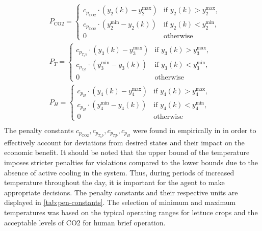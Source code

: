 \begin{equation}
\begin{aligned}
& P_{\text{CO2}} = 
\begin{cases} 
c_{p_{\text{CO2}}} \cdot (y_2(k) - y_2^{\text{max}}) & \text{if } y_2(k) > y_2^{\text{max}} , \\
c_{p_{\text{CO2}}} \cdot (y_2^{\text{min}} - y_2(k)) & \text{if } y_2(k) < y_2^{\text{min}} , \\
0 & \text{otherwise}
\end{cases}
\\
& P_{T} = 
\begin{cases} 
c_{p_{T_ub}} \cdot (y_3(k) - y_3^{\text{max}}) & \text{if } y_3(k) > y_3^{\text{max}} , \\
c_{p_{T_lb}} \cdot (y_3^{\text{min}} - y_3(k)) & \text{if } y_3(k) < y_3^{\text{min}} , \\
0 & \text{otherwise}
\end{cases}
\\
& P_{H} = 
\begin{cases} 
c_{p_{H}} \cdot (y_4(k) - y_4^{\text{max}}) & \text{if } y_4(k) > y_4^{\text{max}} , \\
c_{p_{H}} \cdot (y_4^{\text{min}} - y_4(k)) & \text{if } y_4(k) < y_4^{\text{min}} , \\
0 & \text{otherwise}
\end{cases}
\\
\end{aligned}
\end{equation}
The penalty constants $c_{p_{\text{CO2}}},c_{p_{T_ub}},c_{p_{T_lb}},c_{p_{H}}$ were found in empirically in \cite{jansenOptimalControlLettuce2023} in order to effectively account for deviations from desired states and their impact on the economic benefit. It should be noted that the upper bound of the temperature  imposes stricter penalties for violations compared to the lower bounds due to the absence of active cooling in the system.  Thus, during periods of increased temperature throughout the day, it is important for the agent to make appropriate decisions. The penalty constants and their respective units are displayed in \autoref{tab:pen-constants}. The selection of minimum and maximum temperatures was based on the typical operating ranges for lettuce crops and the acceptable levels of CO2 for human brief operation.

